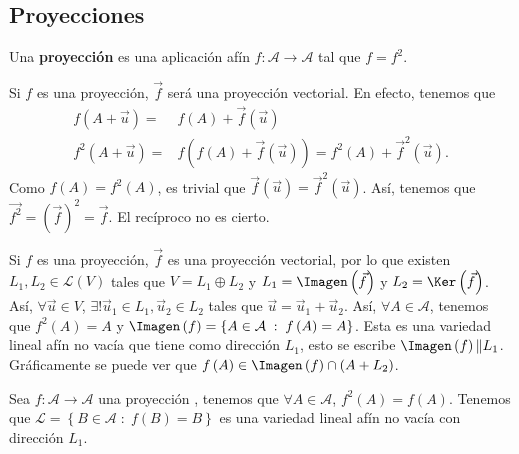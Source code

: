 \subsection{Proyecciones}
\begin{fdefinition}[Proyección]
\normalfont Una \textbf{proyección} es una aplicación afín $\displaystyle f : \mathcal{A} \to \mathcal{A} $ tal que $\displaystyle f = f^{2}$.
\end{fdefinition}
\begin{observation}
\normalfont Si $\displaystyle f $ es una proyección, $\displaystyle \vec{f}  $ será una proyección vectorial. En efecto, tenemos que
\[
\begin{split}
	f\left(A + \vec{u}\right) = & f\left(A\right) + \vec{f}\left(\vec{u}\right) \\
	f^{2}\left(A + \vec{u}\right) = & f\left(f\left(A\right) + \vec{f}\left(\vec{u}\right)\right) = f^{2}\left(A\right) + \vec{f}^{2}\left(\vec{u}\right).
\end{split}
\]
Como $\displaystyle f\left(A\right) = f^{2}\left(A\right) $, es trivial que $\displaystyle \vec{f}\left(\vec{u}\right) = \vec{f}^{2}\left(\vec{u}\right) $. Así, tenemos que $\displaystyle \vec{f^{2}} = \left(\vec{f}\right)^{2} = \vec{f} $. El recíproco no es cierto.
\end{observation}
\begin{observation}
\normalfont Si $\displaystyle f $ es una proyección, $\displaystyle \vec{f} $ es una proyección vectorial, por lo que existen $\displaystyle L_{1}, L_{2} \in \mathcal{L}\left(V\right) $ tales que $\displaystyle V = L_{1} \oplus L_{2} $ y $\displaystyle L_{1} = \Imagen\left(\vec{f}\right) $ y $\displaystyle L_{2} = \Ker\left(\vec{f}\right) $. Así, $\displaystyle \forall \vec{u} \in V $, $\displaystyle \exists!\vec{u}_{1} \in L_{1}, \vec{u}_{2} \in L_{2} $ tales que $\displaystyle \vec{u}= \vec{u}_{1} + \vec{u}_{2} $.
Así, $\displaystyle \forall A \in \mathcal{A} $, tenemos que $\displaystyle f^{2}\left(A\right) = A $ y $\displaystyle \Imagen\left(f\right) = \left\{ A \in \mathcal{A} \; : \; f\left(A\right) = A\right\}  $. Esta es una variedad lineal afín no vacía que tiene como dirección $\displaystyle L_{1} $, esto se escribe $\displaystyle \Imagen\left(f\right) \| L_{1} $. Gráficamente se puede ver que $\displaystyle f\left(A\right) \in \Imagen\left(f\right) \cap \left(A + L_{2}\right) $.
\end{observation}
Sea $\displaystyle f : \mathcal{A} \to \mathcal{A} $ una proyección , tenemos que $\displaystyle \forall A \in \mathcal{A} $, $\displaystyle f^{2}\left(A\right) = f\left(A\right) $. Tenemos que $\displaystyle \mathcal{L} = \left\{ B \in \mathcal{A} \; : \; f\left(B\right) = B\right\}  $ es una variedad lineal afín no vacía con dirección $\displaystyle L_{1} $. 
